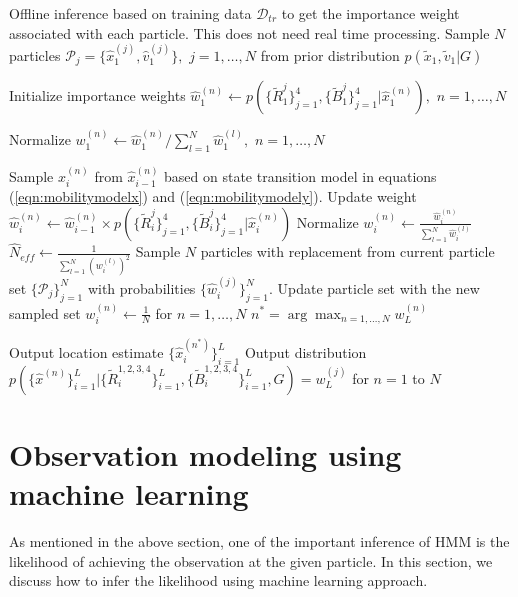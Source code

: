 \documentclass[conference, 10pt]{IEEEtran}
\begin{document}
\begin{algorithm}
\caption{$5GLocalizeAlgo(\mathcal{D}_{tr},G,N_{th})$}
\label{alg:LocalizeUEpf}
\begin{algorithmic}[1]
\State Offline inference based on training data $\mathcal{D}_{tr}$ to get the importance weight associated with each particle. This does not need real time processing.
\State Sample $N$ particles $\mathcal{P}_j = \{\hat{x}_1^{(j)},\hat{v}_1^{(j)}\},$ $j=1,\hdots , N$ 
from prior distribution $p(\tilde{x}_1, \tilde{v}_1|G)$ 

\State Initialize importance weights $\hat{w}_1^{(n)} \gets p(\{\tilde{R}^j_1\}_{j=1}^4,\{\tilde{B}^j_1\}_{j=1}^4|\hat{x}_1^{(n)}),$ $n=1,\hdots , N$

\State Normalize $w_1^{(n)} \gets \hat{w}_1^{(n)}/\sum_{l=1}^N \hat{w}_1^{(l)},$ $n=1,\hdots , N$

		\State Sample $\hat{x}_i^{(n)}$ from $\hat{x}_{i-1}^{(n)}$ based on state transition model in equations (\ref{eqn:mobilitymodelx}) and (\ref{eqn:mobilitymodely}).
		\State Update weight $\hat{w}_i^{(n)} \gets \hat{w}_{i-1}^{(n)} \times p(\{\tilde{R}^j_i\}_{j=1}^4, \{\tilde{B}^j_i\}_{j=1}^4|\hat{x}_{i}^{(n)})$ 
	\EndFor
	\State Normalize $w_i^{(n)} \gets \frac{\hat{w}_i^{(n)}}{\sum_{l=1}^N \hat{w}_i^{(l)}}$
	\State $\hat{N}_{eff} \gets \frac{1}{\sum_{l=1}^N (w_{i}^{(l)})^2}$
		\State Sample $N$ particles with replacement from current particle set $\{\mathcal{P}_j\}_{j=1}^N$ with probabilities $\{\hat{w}_i^{(j)}\}_{j=1}^N.$ Update particle set with the new sampled set
		\State $w_i^{(n)} \gets \frac{1}{N}$ for $n=1,\hdots , N$
	\EndIf
\EndFor
\State $n^* = \arg \max_{n = 1 , \hdots, N} w_L^{(n)}$

\State Output location estimate $\{\hat{x}_i^{(n^*)}\}_{i=1}^L$ 
\State Output distribution \\
$p(\{\hat{x}^{(n)}\}_{i=1}^L|\{\tilde{R}^{1,2,3,4}_i\}_{i=1}^L,\{\tilde{B}^{1,2,3,4}_i\}_{i=1}^L,G) = w_L^{(j)}$ for $n=1$ to $N$
\end{algorithmic}
\end{algorithm}  


\section{Observation modeling using machine learning}
\label{sec:channel-model}
As mentioned in the above section, one of the important inference of HMM is the likelihood of achieving the observation at the given particle. In this section, we discuss how to infer the likelihood using machine learning approach. 
\end{document}
